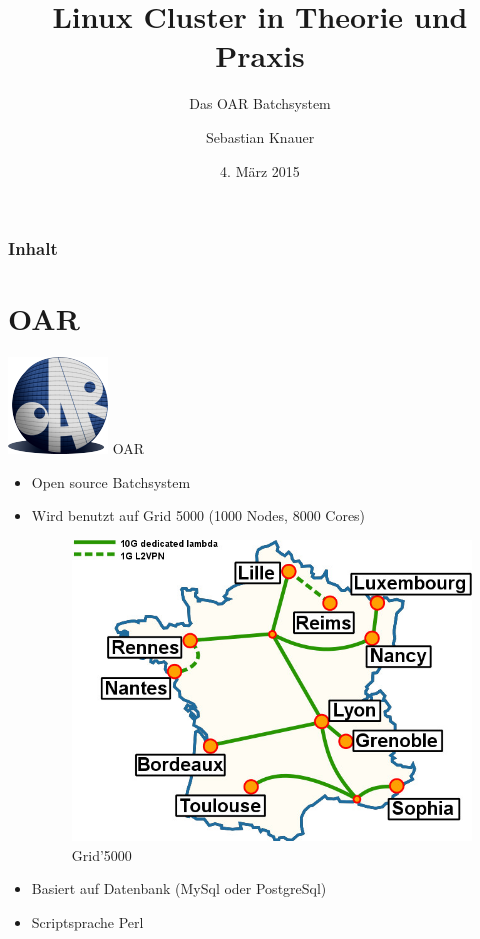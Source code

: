 \documentclass[10pt,utf8]{beamer}
\title{Linux Cluster in Theorie und Praxis}
\subtitle{Das OAR Batchsystem}
\author{Sebastian Knauer}
\date{4. M\"arz 2015}
\institute[ZIH TUD]{Zentrum f\"ur Informationsdienste und Hochleistungsrechnen -- TU Dresden}
\begin{document}
\zihmaketitle

\begin{frame}
\frametitle{Inhalt}
	\tableofcontents
\end{frame}

\section{OAR}
\begin{frame}{\includegraphics[scale=0.22, keepaspectratio]{oar-logo.png}  OAR}
    \begin{itemize}
        \item{Open source Batchsystem}
        \item{Wird benutzt auf Grid 5000 (1000 Nodes, 8000 Cores)
            \begin{figure}
            \centering
	        \includegraphics[scale=1.0, keepaspectratio]{grid5000.jpg}
            \caption{Grid'5000}
            \end{figure}
            }
        \item{Basiert auf Datenbank (MySql oder PostgreSql) }
        \item{Scriptsprache Perl}
    \end{itemize}
\end{frame}
\end{document}
